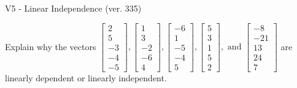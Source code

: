 \begin{exercise}
  \begin{exerciseTitle}V5 - Linear Independence (ver. 335)\end{exerciseTitle}
  \begin{exerciseStatement}
    Explain why the vectors \(\left[\begin{array}{r}
2 \\
5 \\
-3 \\
-4 \\
-5
\end{array}\right] , \left[\begin{array}{r}
1 \\
3 \\
-2 \\
-6 \\
4
\end{array}\right] , \left[\begin{array}{r}
-6 \\
1 \\
-5 \\
-4 \\
5
\end{array}\right] , \left[\begin{array}{r}
5 \\
3 \\
1 \\
5 \\
2
\end{array}\right] , \text{ and } \left[\begin{array}{r}
-8 \\
-21 \\
13 \\
24 \\
7
\end{array}\right]\) are linearly dependent or linearly independent.	



\end{exerciseStatement}
\end{exercise}
